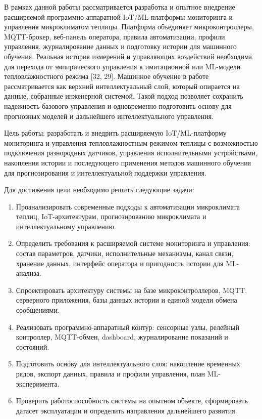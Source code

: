 \documentclass[a4paper,14pt]{extarticle}
\providecommand{\tightlist}{%
  \setlength{\itemsep}{0pt}\setlength{\parskip}{0pt}}
\begin{document}
В рамках данной работы рассматривается разработка и опытное внедрение
расширяемой программно-аппаратной IoT/ML-платформы мониторинга и
управления микроклиматом теплицы. Платформа объединяет микроконтроллеры,
MQTT-брокер, веб-панель оператора, правила автоматизации, профили
управления, журналирование данных и подготовку истории для машинного
обучения. Реальная история измерений и управляющих воздействий
необходима для перехода от эмпирического управления к имитационной или
ML-модели тепловлажностного режима {[}32, 29{]}. Машинное обучение в
работе рассматривается как верхний интеллектуальный слой, который
опирается на данные, собранные инженерной системой. Такой подход
позволяет сохранить надежность базового управления и одновременно
подготовить основу для прогнозных моделей и дальнейшего
интеллектуального управления.

Цель работы: разработать и внедрить расширяемую IoT/ML-платформу
мониторинга и управления тепловлажностным режимом теплицы с возможностью
подключения разнородных датчиков, управления исполнительными
устройствами, накопления истории и последующего применения методов
машинного обучения для прогнозирования и интеллектуальной поддержки
управления.

Для достижения цели необходимо решить следующие задачи:

\begin{enumerate}
\def\labelenumi{\arabic{enumi})}
\tightlist
\item
  Проанализировать современные подходы к автоматизации микроклимата
  теплиц, IoT-архитектурам, прогнозированию микроклимата и
  интеллектуальному управлению.
\item
  Определить требования к расширяемой системе мониторинга и управления:
  состав параметров, датчики, исполнительные механизмы, канал связи,
  хранение данных, интерфейс оператора и пригодность истории для
  ML-анализа.
\item
  Спроектировать архитектуру системы на базе микроконтроллеров, MQTT,
  серверного приложения, базы данных истории и единой модели обмена
  сообщениями.
\item
  Реализовать программно-аппаратный контур: сенсорные узлы, релейный
  контроллер, MQTT-обмен, dashboard, журналирование показаний и
  состояний.
\item
  Подготовить основу для интеллектуального слоя: накопление временных
  рядов, экспорт данных, правила и профили управления, план
  ML-эксперимента.
\item
  Проверить работоспособность системы на опытном объекте, сформировать
  датасет эксплуатации и определить направления дальнейшего развития.
\end{enumerate}
\end{document}
